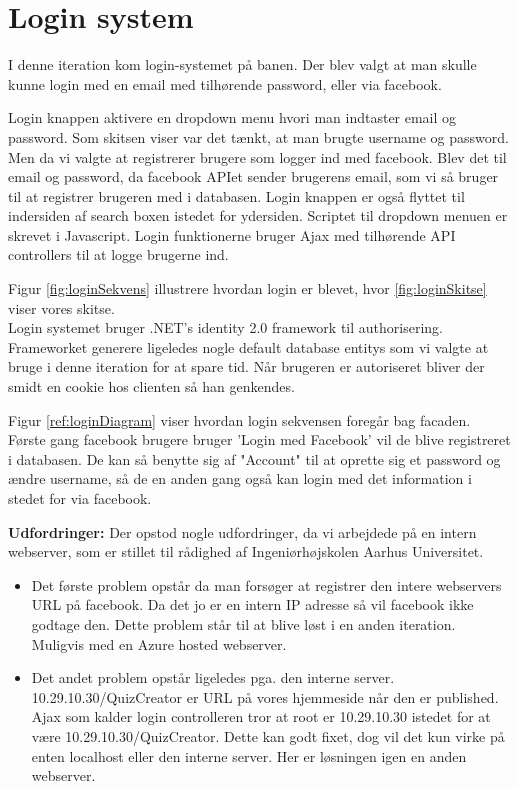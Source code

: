 \chapter{Login system}

I denne iteration kom login-systemet på banen. Der blev valgt at man skulle kunne login med en email med tilhørende password, eller via facebook.


Login knappen aktivere en dropdown menu hvori man indtaster email og password. Som skitsen viser var det tænkt, at man brugte username og password. Men da vi valgte at registrerer brugere som logger ind med facebook. Blev det til email og password, da facebook APIet sender brugerens email, som vi så bruger til at registrer brugeren med i databasen. Login knappen er også flyttet til indersiden af search boxen istedet for ydersiden. Scriptet til dropdown menuen er skrevet i Javascript. Login funktionerne bruger Ajax med tilhørende API controllers til at logge brugerne ind.

Figur \ref{fig:loginSekvens} illustrere hvordan login er blevet, hvor \ref{fig:loginSkitse} viser vores skitse. \\

Login systemet bruger .NET's identity 2.0 framework til authorisering. Frameworket generere ligeledes nogle default database entitys som vi valgte at bruge i denne iteration for at spare tid. Når brugeren er autoriseret bliver der smidt en cookie hos clienten så han genkendes.



Figur \ref{ref:loginDiagram} viser hvordan login sekvensen foregår bag facaden. Første gang facebook brugere bruger 'Login med Facebook' vil de blive registreret i databasen. De kan så benytte sig af "Account" til at oprette sig et password og ændre username, så de en anden gang også kan login med det information i stedet for via facebook.

\textbf{Udfordringer:} 
Der opstod nogle udfordringer, da vi arbejdede på en intern webserver, som er stillet til rådighed af Ingeniørhøjskolen Aarhus Universitet. 

\begin{itemize}
	\item Det første problem opstår da man forsøger at registrer den intere webservers URL på facebook. Da det jo er en intern IP adresse så vil facebook ikke godtage den. Dette problem står til at blive løst i en anden iteration. Muligvis med en Azure hosted webserver.
	\item Det andet problem opstår ligeledes pga. den interne server. 10.29.10.30/QuizCreator er URL på vores hjemmeside når den er published. Ajax som kalder login controlleren tror at root er 10.29.10.30 istedet for at være 10.29.10.30/QuizCreator. Dette kan godt fixet, dog vil det kun virke på enten localhost eller den interne server. Her er løsningen igen en anden webserver.
\end{itemize}